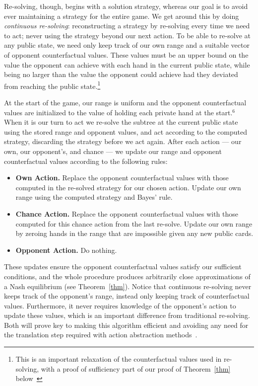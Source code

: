 \documentclass[12pt]{article}
\begin{document}
Re-solving, though, begins with a solution strategy, whereas our goal is to avoid ever maintaining a strategy for the entire game.  We get around this by doing \emph{continuous re-solving}: reconstructing a strategy by re-solving every time we need to act; never using the strategy beyond our next action.  To be able to re-solve at any public state, we need only keep track of our own range and a suitable vector of opponent counterfactual values.  These values must be an upper bound on the value the opponent can achieve with each hand in the current public state, while being no larger than the value the opponent could achieve had they deviated from reaching the public state.\footnote{This is an important relaxation of the counterfactual values used in re-solving, with a proof of sufficiency part of our proof of Theorem~\ref{thm} below~\cite{SOM}}

At the start of the game, our range is uniform and the opponent counterfactual values are initialized to the value of holding each private hand at the start.$^6$  When it is our turn to act we re-solve the subtree at the current public state using the stored range and opponent values, and act according to the computed strategy, discarding the strategy before we act again.  After each action --- our own, our opponent's, and chance --- we update our range and opponent counterfactual values according to the following rules:
\begin{itemize}
\item{\bf Own Action.}  Replace the opponent 
counterfactual values with those computed in the re-solved strategy for our chosen action.
Update our own range using the computed strategy and Bayes' rule.  
\item{\bf Chance Action.}  Replace the opponent counterfactual values with those computed for this chance action from the last re-solve.  Update our own range by zeroing hands in the range that are impossible given any new public cards.
\item{\bf Opponent Action.} Do nothing.
\end{itemize}
These updates ensure the opponent counterfactual values satisfy our sufficient conditions, and the whole procedure produces arbitrarily close approximations of a Nash equilibrium (see Theorem~\ref{thm}).
Notice that continuous re-solving never keeps track of the opponent's range, instead only keeping track of counterfactual values.  Furthermore, it never requires knowledge of the opponent's action to update these values, which is an important difference from traditional re-solving.  Both will prove key to making this algorithm efficient and avoiding any need for the translation step required with action abstraction methods~\cite{Gilpin08:Tartanian,Schnizlein09:Translation}.
\end{document}

